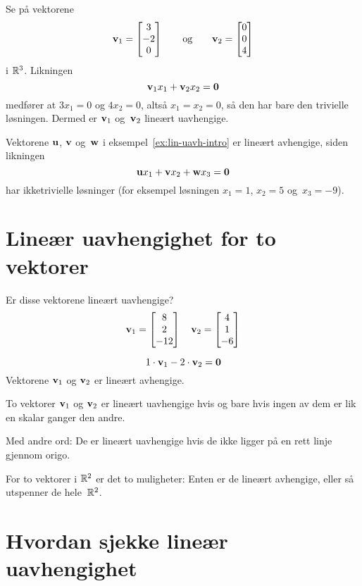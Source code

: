\begin{ex}
Se på vektorene
\[
\mathbf{v}_1 = \begin{bmatrix} 3 \\ -2 \\ 0 \end{bmatrix}
\qquad\text{og}\qquad
\mathbf{v}_2 = \begin{bmatrix} 0 \\ 0 \\ 4 \end{bmatrix}
\]
i $\mathbb{R}^3$.  Likningen
\[
\mathbf{v}_1 x_1 + \mathbf{v}_2 x_2 = \mathbf{0}
\]
medfører at $3x_1 = 0$ og $4 x_2 = 0$, altså $x_1 = x_2 = 0$, så den
har bare den trivielle løsningen.  Dermed er $\mathbf{v}_1$ og~$\mathbf{v}_2$
lineært uavhengige.
\end{ex}

\begin{ex}
Vektorene $\mathbf{u}$, $\mathbf{v}$ og~$\mathbf{w}$ i
eksempel~\ref{ex:lin-uavh-intro} er lineært avhengige, siden likningen
\[
\mathbf{u} x_1 + \mathbf{v} x_2 + \mathbf{w} x_3 = \mathbf{0}
\]
har ikketrivielle løsninger (for eksempel løsningen $x_1 = 1$,
$x_2 = 5$ og~$x_3 = -9$).
\end{ex}



\section*{Lineær uavhengighet for to vektorer}

\begin{ex}
Er disse vektorene lineært uavhengige?
\[
\mathbf{v}_1 = \begin{bmatrix} 8 \\ 2 \\ -12 \end{bmatrix}\quad
\mathbf{v}_2 = \begin{bmatrix} 4 \\ 1 \\ -6 \end{bmatrix}
\]

\[
1 \cdot \mathbf{v}_1 - 2 \cdot \mathbf{v}_2 = \mathbf{0}
\]
Vektorene $\mathbf{v}_1$ og $\mathbf{v}_2$ er lineært avhengige.
\end{ex}

\begin{thm}
To vektorer $\mathbf{v}_1$ og $\mathbf{v}_2$ er lineært uavhengige hvis og bare
hvis ingen av dem er lik en skalar ganger den andre.
\end{thm}

Med andre ord: De er lineært uavhengige hvis de ikke ligger på en rett
linje gjennom origo.

For to vektorer i $\mathbb{R}^2$ er det to muligheter: Enten er de lineært
avhengige, eller så utspenner de hele~$\mathbb{R}^2$.





\section*{Hvordan sjekke lineær uavhengighet}

